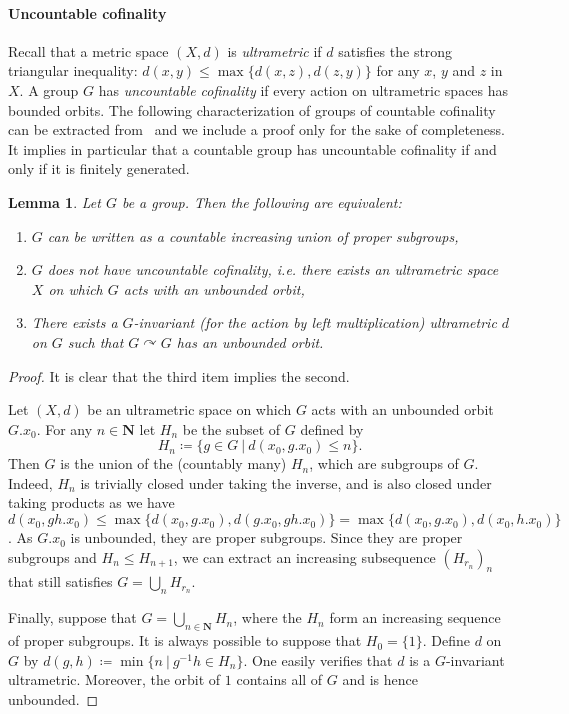 \documentclass[a4paper]{article}
\newtheorem{lem}{Lemma}[section]
\theoremstyle{definition}
\newcommand*{\field}[1]{\mathbf{#1}}
\newcommand*{\N}{\field{N}}
\newcommand{\setst}[2]{\{#1\ |\ #2\}}
\begin{document}
\paragraph{Uncountable cofinality}
Recall that a metric space $(X,d)$ is \emph{ultrametric} if $d$ satisfies the strong triangular inequality: $d(x,y)\leq\max\{d(x,z),d(z,y)\}$ for any $x$, $y$ and $z$ in $X$.
A group $G$ has \emph{uncountable cofinality} if every action on ultrametric spaces has bounded orbits.
The following characterization of groups of countable cofinality can be extracted from~\cite{MR2240370} and we include a proof only for the sake of completeness.
It implies in particular that a countable group has uncountable cofinality if and only if it is finitely generated.
%
%
\begin{lem}\label{Lemma:CofSub}
Let $G$ be a group. Then the following are equivalent:
\begin{enumerate}
\item $G$ can be written as a countable increasing union of proper subgroups,
\item $G$ does not have uncountable cofinality, i.e. there exists an ultrametric space $X$ on which $G$ acts with an unbounded orbit,
\item There exists a $G$-invariant (for the action by left multiplication) ultrametric $d$ on $G$ such that $G\curvearrowright G$ has an unbounded orbit.
\end{enumerate}
\end{lem}
\begin{proof}
It is clear that the third item implies the second.

Let $(X,d)$ be an ultrametric space on which $G$ acts with an unbounded orbit~$G.x_0$. For any $n\in \N$ let $H_n$ be the subset of $G$ defined by
\[
	H_n\coloneqq\setst{g\in G}{d(x_0,g.x_0)\leq n}.
\]
Then $G$ is the union of the (countably many) $H_n$, which are subgroups of $G$.
Indeed, $H_n$ is trivially closed under taking the inverse, and is also closed under taking products as we have $d(x_0,gh.x_0)\leq\max\{d(x_0,g.x_0),d(g.x_0,gh.x_0)\}=\max\{d(x_0,g.x_0),d(x_0,h.x_0)\}$.
As $G.x_0$ is unbounded, they are proper subgroups.
Since they are proper subgroups and $H_n\leq H_{n+1}$, we can extract an increasing subsequence $(H_{r_n})_n$ that still satisfies $G=\bigcup_n H_{r_n}$.

Finally, suppose that $G=\bigcup_{n\in \N}H_n$, where the $H_n$ form an increasing sequence of proper subgroups.
It is always possible to suppose that $H_0=\{1\}$.
Define $d$ on $G$ by $d(g,h)\coloneqq\min\setst{n}{g^{-1}h\in H_n}$.
One easily verifies that $d$ is a $G$-invariant ultrametric. Moreover, the orbit of $1$ contains all of $G$ and is hence unbounded.
\end{proof}
\end{document}

